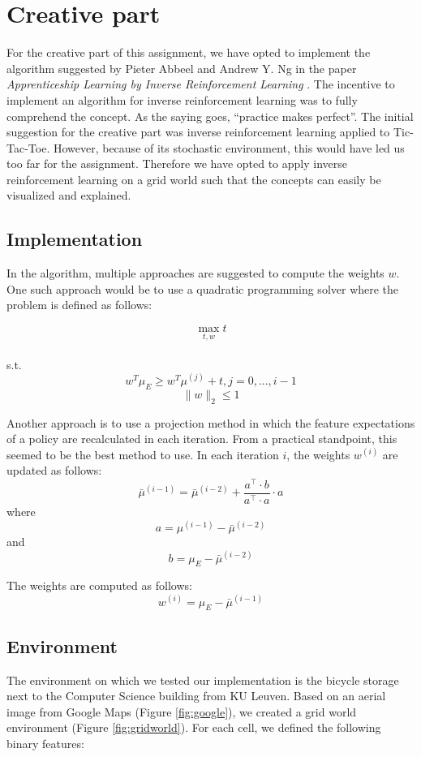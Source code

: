 \documentclass[10pt,a4paper,twocolumn]{article}
\begin{document}
\section{Creative part}
For the creative part of this assignment, we have opted to implement the algorithm suggested by Pieter Abbeel and Andrew Y. Ng  in the paper \textit{Apprenticeship Learning by Inverse Reinforcement Learning} \cite{abbeel2004apprenticeship}. The incentive to implement an algorithm for inverse reinforcement learning was to fully comprehend the concept. As the saying goes, ``practice makes perfect''. The initial suggestion for the creative part was inverse reinforcement learning applied to Tic-Tac-Toe. However, because of its stochastic environment, this would have led us too far for the assignment. Therefore we have opted to apply inverse reinforcement learning on a grid world such that the concepts can easily be visualized and explained.

\subsection{Implementation}
In the algorithm, multiple approaches are suggested to compute the weights $w$. One such approach would be to use a quadratic programming solver where the problem is defined as follows:

$$\max\limits_{t, w} t$$\\
s.t. $$w^T \mu_E \geq w^T \mu^{(j)} + t, j= 0,...,i-1$$
$$\|w\|_2 \leq 1$$

Another approach is to use a projection method in which the feature expectations of a policy are recalculated in each iteration. From a practical standpoint, this seemed to be the best method to use. In each iteration $i$, the weights $w^{(i)}$ are updated as follows:\\
$$\bar{\mu}^{(i-1)} = \bar{\mu}^{(i-2)} + \frac
	{a^\intercal\cdot b}
	{a^\intercal\cdot a}
	\cdot
	a$$
where 
$$a = \mu^{(i-1)}-\bar{\mu}^{(i-2)}$$
and
$$b = \mu_E - \bar{\mu}^{(i-2)}$$

The weights are computed as follows:
$$w^{(i)} = \mu_E - \bar{\mu}^{(i-1)}$$


\subsection{Environment}
The environment on which we tested our implementation is the bicycle storage next to the Computer Science building from KU Leuven. Based on an aerial image from Google Maps (Figure \ref{fig:google}), we created a grid world environment (Figure \ref{fig:gridworld}). For each cell, we defined the following binary features:
\end{document}
